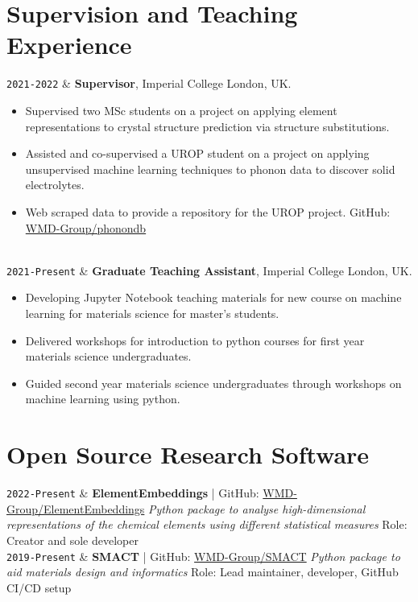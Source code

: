\documentclass[11pt,a4paper]{article}
\newcommand{\ICL}{Imperial College London}
\newcommand{\Duration}[2]{\fontsize{10pt}{0}\selectfont \texttt{#1-#2}}
\newcommand{\Ongoing}{Present}
\newcommand{\GitHub}[1]{\faGithub{} GitHub: \href{https://github.com/#1}{#1}}
\begin{document}
\section{Supervision and Teaching Experience}

\begin{EntriesTableDuration}
  \Duration{2021}{2022} & \textbf{Supervisor}, \ICL{}, UK.
  \begin{itemize}
    \item Supervised two MSc students on a project on applying element representations to crystal structure prediction via structure substitutions.
    \item Assisted and co-supervised a UROP student on a project on applying unsupervised machine learning techniques to phonon data to discover solid electrolytes. 
    \item Web scraped data to provide a repository for the UROP project. \GitHub{WMD-Group/phonondb} 
    \vspace{-\baselineskip}
  \end{itemize}
  \\
  \Duration{2021}{\Ongoing} & \textbf{Graduate Teaching Assistant}, \ICL{}, UK.
  \begin{itemize}
    \item Developing Jupyter Notebook teaching materials for new course on machine learning for materials science for master's students.
    \item Delivered workshops for introduction to python courses for first year materials science undergraduates.
    \item Guided second year materials science undergraduates through workshops on machine learning using python.
    \vspace{-\baselineskip}
  \end{itemize}
\end{EntriesTableDuration}

\section{Open Source Research Software}

\begin{EntriesTableDuration}
  \Duration{2022}{\Ongoing} &
  \textbf{ElementEmbeddings} | \GitHub{WMD-Group/ElementEmbeddings}
  \newline
  \textit{Python package to analyse high-dimensional representations of the chemical elements using different statistical measures}
  \newline
  Role: Creator and sole developer
  \\
  \Duration{2019}{\Ongoing} &
  \textbf{SMACT} | \GitHub{WMD-Group/SMACT}
  \newline
  \textit{Python package to aid materials design and informatics}
  \newline
  Role: Lead maintainer, developer, GitHub CI/CD setup
\end{EntriesTableDuration}
\end{document}
